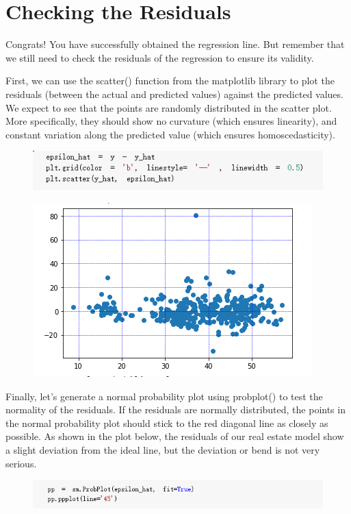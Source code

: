 \documentclass{article}
\begin{document}
\section*{Checking the Residuals}
Congrats! You have successfully obtained the regression line. But remember that we still need to check the residuals of the regression to ensure its validity.

First, we can use the scatter() function from the matplotlib library to plot the residuals (between the actual and predicted values) against the predicted values. We expect to see that the points are randomly distributed in the scatter plot. More specifically, they should show no curvature (which ensures linearity), and constant variation along the predicted value (which ensures homoscedasticity).
\begin{figure}[H]\centering\includegraphics[width=0.9\linewidth]{19}\end{figure}
\begin{figure}[H]\centering\includegraphics[width=0.6\linewidth]{20}\end{figure}
Finally, let's generate a normal probability plot using probplot() to test the normality of the residuals. If the residuals are normally distributed, the points in the normal probability plot should stick to the red diagonal line as closely as possible. As shown in the plot below, the residuals of our real estate model show a slight deviation from the ideal line, but the deviation or bend is not very serious.
\begin{figure}[H]\centering\includegraphics[width=\linewidth]{21}\end{figure}
\end{document}

